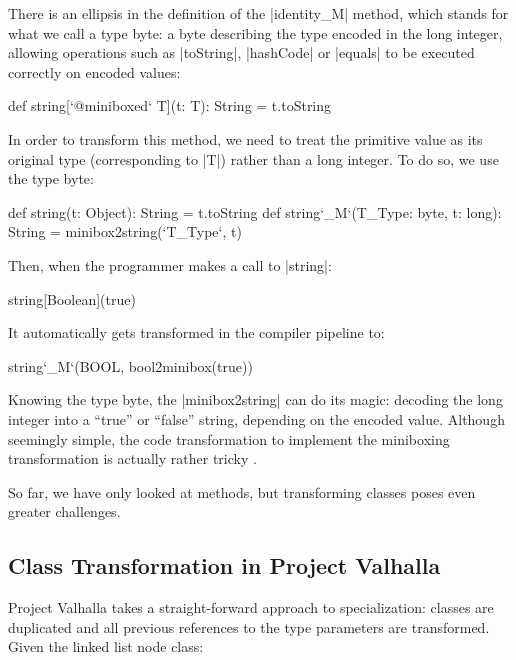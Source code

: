 There is an ellipsis in the definition of the |identity_M| method, which stands for what we call a type byte: a byte describing the type encoded in the long integer, allowing operations such as |toString|, |hashCode| or |equals| to be executed correctly on encoded values:

\begin{lstlisting-nobreak}
 def string[`@miniboxed` T](t: T): String = t.toString
\end{lstlisting-nobreak}

In order to transform this method, we need to treat the primitive value as its original type (corresponding to |T|) rather than a long integer. To do so, we use the type byte:

\begin{lstlisting-nobreak}
 def string(t: Object): String = t.toString
 def string`_M`(T_Type: byte, t: long): String =
                                       minibox2string(`T_Type`, t)
\end{lstlisting-nobreak}

Then, when the programmer makes a call to |string|:

\begin{lstlisting-nobreak}
 string[Boolean](true)
\end{lstlisting-nobreak}

It automatically gets transformed in the compiler pipeline to:

\begin{lstlisting-nobreak}
 string`_M`(BOOL, bool2minibox(true))
\end{lstlisting-nobreak}

Knowing the type byte, the |minibox2string| can do its magic: decoding the long integer into a ``true'' or ``false'' string, depending on the encoded value. Although seemingly simple, the code transformation to implement the miniboxing transformation is actually rather tricky \cite{miniboxing-linkedlist, ldl, ildl-tech}.

So far, we have only looked at methods, but transforming classes poses even greater challenges.



\subsection{Class Transformation in Project Valhalla}



Project Valhalla takes a straight-forward approach to specialization: classes are duplicated and all previous references to the type parameters are transformed. Given the linked list node class:



